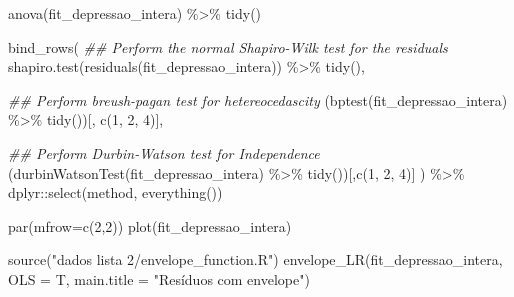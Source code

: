 \documentclass[
  letterpaper,
  DIV=11,
  numbers=noendperiod]{scrartcl}
\newenvironment{Shaded}{\begin{snugshade}}{\end{snugshade}}
\newcommand{\AttributeTok}[1]{\textcolor[rgb]{0.40,0.45,0.13}{#1}}
\newcommand{\DecValTok}[1]{\textcolor[rgb]{0.68,0.00,0.00}{#1}}
\newcommand{\DocumentationTok}[1]{\textcolor[rgb]{0.37,0.37,0.37}{\textit{#1}}}
\newcommand{\FunctionTok}[1]{\textcolor[rgb]{0.28,0.35,0.67}{#1}}
\newcommand{\NormalTok}[1]{\textcolor[rgb]{0.00,0.23,0.31}{#1}}
\newcommand{\SpecialCharTok}[1]{\textcolor[rgb]{0.37,0.37,0.37}{#1}}
\newcommand{\StringTok}[1]{\textcolor[rgb]{0.13,0.47,0.30}{#1}}
\begin{document}
\begin{Shaded}
\begin{Highlighting}[]
\FunctionTok{anova}\NormalTok{(fit\_depressao\_intera) }\SpecialCharTok{\%\textgreater{}\%}
  \FunctionTok{tidy}\NormalTok{()}

\FunctionTok{bind\_rows}\NormalTok{(}
  \DocumentationTok{\#\# Perform the normal Shapiro{-}Wilk test for the residuals}
  \FunctionTok{shapiro.test}\NormalTok{(}\FunctionTok{residuals}\NormalTok{(fit\_depressao\_intera)) }\SpecialCharTok{\%\textgreater{}\%} \FunctionTok{tidy}\NormalTok{(),}
  
  \DocumentationTok{\#\# Perform breush{-}pagan test for hetereocedascity}
\NormalTok{  (}\FunctionTok{bptest}\NormalTok{(fit\_depressao\_intera) }\SpecialCharTok{\%\textgreater{}\%} \FunctionTok{tidy}\NormalTok{())[, }\FunctionTok{c}\NormalTok{(}\DecValTok{1}\NormalTok{, }\DecValTok{2}\NormalTok{, }\DecValTok{4}\NormalTok{)],}
  
  \DocumentationTok{\#\# Perform Durbin{-}Watson test for Independence}
\NormalTok{  (}\FunctionTok{durbinWatsonTest}\NormalTok{(fit\_depressao\_intera) }\SpecialCharTok{\%\textgreater{}\%} \FunctionTok{tidy}\NormalTok{())[,}\FunctionTok{c}\NormalTok{(}\DecValTok{1}\NormalTok{, }\DecValTok{2}\NormalTok{, }\DecValTok{4}\NormalTok{)]}
\NormalTok{) }\SpecialCharTok{\%\textgreater{}\%}
\NormalTok{  dplyr}\SpecialCharTok{::}\FunctionTok{select}\NormalTok{(method, }\FunctionTok{everything}\NormalTok{())}

\FunctionTok{par}\NormalTok{(}\AttributeTok{mfrow=}\FunctionTok{c}\NormalTok{(}\DecValTok{2}\NormalTok{,}\DecValTok{2}\NormalTok{))}
\FunctionTok{plot}\NormalTok{(fit\_depressao\_intera)}

\FunctionTok{source}\NormalTok{(}\StringTok{"dados lista 2/envelope\_function.R"}\NormalTok{)}
\FunctionTok{envelope\_LR}\NormalTok{(fit\_depressao\_intera, }\AttributeTok{OLS =}\NormalTok{ T, }\AttributeTok{main.title =} \StringTok{"Resíduos com envelope"}\NormalTok{)}
\end{Highlighting}
\end{Shaded}
\end{document}
